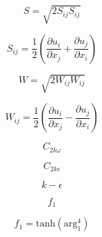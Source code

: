 {\newpage\clearpage
{}%
\begin{displaymath}
S=\sqrt{2S_{ij}S_{ij}}
\end{displaymath}%
\lthtmldisplayZ
\lthtmlcheckvsize\clearpage}

{\newpage\clearpage
{}%
\begin{displaymath}
S_{ij}=\frac{1}{2}(\frac{\partial 
u_{i}}{\partial x_{j}}+\frac{\partial u_{j}}{\partial x_{i}})
\end{displaymath}%
\lthtmldisplayZ
\lthtmlcheckvsize\clearpage}

{\newpage\clearpage
{}%
\begin{displaymath}
W=\sqrt{2W_{ij}W_{ij}}
\end{displaymath}%
\lthtmldisplayZ
\lthtmlcheckvsize\clearpage}

{\newpage\clearpage
{}%
\begin{displaymath}
W_{ij}=\frac{1}{2}(\frac{\partial 
u_{i}}{\partial x_{j}}-\frac{\partial u_{j}}{\partial x_{i}})
\end{displaymath}%
\lthtmldisplayZ
\lthtmlcheckvsize\clearpage}

{\newpage\clearpage
{}%
\begin{displaymath}
C_{2k\omega}
\end{displaymath}%
\lthtmldisplayZ
\lthtmlcheckvsize\clearpage}

{\newpage\clearpage
{}%
\begin{displaymath}
C_{2k\epsilon}
\end{displaymath}%
\lthtmldisplayZ
\lthtmlcheckvsize\clearpage}

{\newpage\clearpage
{}%
\begin{displaymath}
k-\epsilon
\end{displaymath}%
\lthtmldisplayZ
\lthtmlcheckvsize\clearpage}

{\newpage\clearpage
{}%
\begin{displaymath}
f_1
\end{displaymath}%
\lthtmldisplayZ
\lthtmlcheckvsize\clearpage}

{\newpage\clearpage
{}%
\begin{displaymath}
f_{1}=\text{tanh}(\text{arg}_{1}^{4})
\end{displaymath}%
\lthtmldisplayZ
\lthtmlcheckvsize\clearpage}

